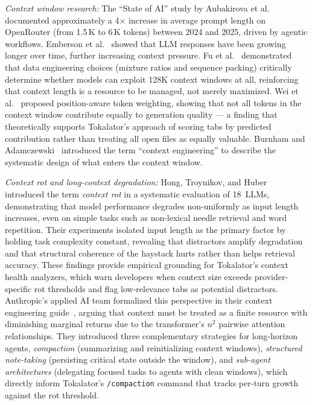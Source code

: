\documentclass[a4paper,fleqn]{cas-dc}
\begin{document}
\textit{Context window research:}
The ``State of AI'' study by Aubakirova et al.~\cite{aubakirova2025state} documented approximately a 4$\times$ increase in average prompt length on OpenRouter (from 1.5\,K to 6\,K tokens) between 2024 and 2025, driven by agentic workflows. Emberson et al.~\cite{emberson2025length} showed that LLM responses have been growing longer over time, further increasing context pressure. Fu et al.~\cite{fu2024scaling} demonstrated that data engineering choices (mixture ratios and sequence packing) critically determine whether models can exploit 128K context windows at all, reinforcing that context length is a resource to be managed, not merely maximized. Wei et al.~\cite{wei2025tokenweighting} proposed position-aware token weighting, showing that not all tokens in the context window contribute equally to generation quality — a finding that theoretically supports Tokalator's approach of scoring tabs by predicted contribution rather than treating all open files as equally valuable. Burnham and Adamczewski~\cite{burnham2025context} introduced the term ``context engineering'' to describe the systematic design of what enters the context window.

\textit{Context rot and long-context degradation:}
Hong, Troynikov, and Huber~\cite{hong2025contextrot} introduced the term \emph{context rot} in a systematic evaluation of 18~LLMs, demonstrating that model performance degrades non-uniformly as input length increases, even on simple tasks such as non-lexical needle retrieval and word repetition. Their experiments isolated input length as the primary factor by holding task complexity constant, revealing that distractors amplify degradation and that structural coherence of the haystack hurts rather than helps retrieval accuracy. These findings provide empirical grounding for Tokalator's context health analyzers, which warn developers when context size exceeds provider-specific rot thresholds and flag low-relevance tabs as potential distractors. Anthropic's applied AI team formalized this perspective in their context engineering guide~\cite{anthropic2025contexteng}, arguing that context must be treated as a finite resource with diminishing marginal returns due to the transformer's $n^2$ pairwise attention relationships. They introduced three complementary strategies for long-horizon agents, \emph{compaction} (summarizing and reinitializing context windows), \emph{structured note-taking} (persisting critical state outside the window), and \emph{sub-agent architectures} (delegating focused tasks to agents with clean windows), which directly inform Tokalator's \texttt{/compaction} command that tracks per-turn growth against the rot threshold.
\end{document}
